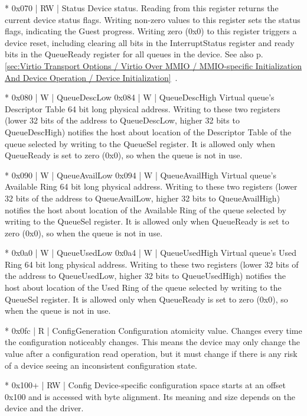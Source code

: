* 0x070 | RW | Status
  Device status.
  Reading from this register returns the current device status
  flags.
  Writing non-zero values to this register sets the status flags,
  indicating the Guest progress. Writing zero (0x0) to this
  register triggers a device reset, including clearing all
  bits in the InterruptStatus register and ready bits in the
  QueueReady register for all queues in the device.
  See also p. \ref{sec:Virtio Transport Options / Virtio Over MMIO / MMIO-specific Initialization And Device Operation / Device Initialization}~.

* 0x080 | W | QueueDescLow
  0x084 | W | QueueDescHigh
  Virtual queue's Descriptor Table 64 bit long physical address.
  Writing to these two registers (lower 32 bits of the address
  to QueueDescLow, higher 32 bits to QueueDescHigh) notifies
  the host about location of the Descriptor Table of the queue
  selected by writing to the QueueSel register. It is allowed
  only when QueueReady is set to zero (0x0), so when the queue
  is not in use.

* 0x090 | W | QueueAvailLow
  0x094 | W | QueueAvailHigh
  Virtual queue's Available Ring 64 bit long physical address.
  Writing to these two registers (lower 32 bits of the address
  to QueueAvailLow, higher 32 bits to QueueAvailHigh) notifies
  the host about location of the Available Ring of the queue
  selected by writing to the QueueSel register. It is allowed
  only when QueueReady is set to zero (0x0), so when the queue
  is not in use.

* 0x0a0 | W | QueueUsedLow
  0x0a4 | W | QueueUsedHigh
  Virtual queue's Used Ring 64 bit long physical address.
  Writing to these two registers (lower 32 bits of the address
  to QueueUsedLow, higher 32 bits to QueueUsedHigh) notifies
  the host about location of the Used Ring of the queue
  selected by writing to the QueueSel register. It is allowed
  only when QueueReady is set to zero (0x0), so when the queue
  is not in use.

* 0x0fc | R | ConfigGeneration
  Configuration atomicity value.
  Changes every time the configuration noticeably changes. This
  means the device may only change the value after a configuration
  read operation, but it must change if there is any risk of a
  device seeing an inconsistent configuration state.

* 0x100+ | RW | Config
  Device-specific configuration space starts at an offset 0x100
  and is accessed with byte alignment. Its meaning and size
  depends on the device and the driver.

